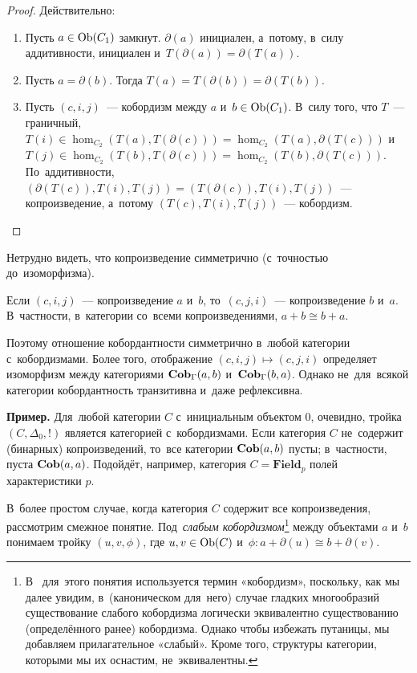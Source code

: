 \documentclass[a4paper,oneside]{article}
\begin{document}
\begin{proof}
    Действительно:
    \begin{enumerate}
        \item Пусть $a \in \mathrm{Ob}(C_1)$ замкнут. $\partial(a)$ инициален, а~потому, в~силу аддитивности,
        инициален и~$T(\partial(a)) = \partial(T(a))$.

        \item Пусть $a = \partial(b)$. Тогда $T(a) = T(\partial(b)) = \partial(T(b))$.

        \item Пусть $(c, i, j)$~— кобордизм между $a$ и~$b \in \mathrm{Ob}(C_1)$.
              В~силу того, что $T$~— граничный, $T(i) \in \hom_{C_2}(T(a), T(\partial(c))) = \hom_{C_2}(T(a), \partial(T(c)))$
              и~$T(j) \in \hom_{C_2}(T(b), T(\partial(c))) = \hom_{C_2}(T(b), \partial(T(c)))$.
              По~аддитивности, $(\partial(T(c)),\allowbreak T(i),\allowbreak T(j)) = (T(\partial(c)), T(i), T(j))$~— копроизведение,
              а~потому $(T(c),\allowbreak T(i),\allowbreak T(j))$~— кобордизм.
    \end{enumerate}
\end{proof}

Нетрудно видеть, что копроизведение симметрично (с~точностью до~изоморфизма).

\begin{statement*}
    Если $(c, i, j)$~— копроизведение $a$ и~$b$, то~$(c, j, i)$~— копроизведение $b$ и~$a$.
    В~частности, в~категории со~всеми копроизведениями, $a + b \cong b + a$.
\end{statement*}

Поэтому отношение кобордантности симметрично в~любой категории с~кобордизмами. Более того, отображение $(c, i, j) \mapsto (c, j, i)$
определяет изоморфизм между категориями $\mathbf{Cob}_\Gamma(a, b)$ и~$\mathbf{Cob}_\Gamma(b, a)$.
Однако не~для~всякой категории кобордантность транзитивна и~даже рефлексивна.

\medskip
\noindent\textbf{Пример.} Для~любой категории $C$ с~инициальным объектом $0$, очевидно, тройка $(C, \Delta_0, !)$
является категорией с~кобордизмами. Если категория $C$ не~содержит (бинарных) копроизведений,
то~все категории $\mathbf{Cob}(a, b)$ пусты; в~частности, пуста $\mathbf{Cob}(a, a)$.
Подойдёт, например, категория $C = \mathbf{Field}_p$ полей характеристики $p$.

\medskip

В~более простом случае, когда категория $C$ содержит все копроизведения, рассмотрим смежное понятие.
Под~\textit{слабым кобордизмом}\footnote{
    В~\cite{Stong68} для~этого понятия используется термин «кобордизм», поскольку, как мы далее
    увидим, в~(каноническом для~него) случае гладких многообразий существование слабого кобордизма
    логически эквивалентно существованию (определённого ранее) кобордизма. Однако чтобы избежать путаницы,
    мы добавляем прилагательное «слабый». Кроме того, структуры категории, которыми мы их оснастим, не~эквивалентны.
} между объектами $a$ и~$b$
понимаем тройку $(u, v, \phi)$, где $u, v \in \mathrm{Ob}(C)$ и~$\phi : a + \partial(u) \cong b + \partial(v)$.
\end{document}
